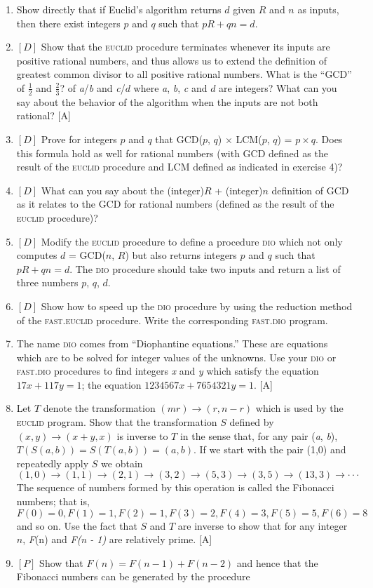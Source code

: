 \documentclass{book}
\begin{document}
\begin{enumerate}
\item Show directly that if Euclid's algorithm returns $d$ given $R$ and $n$ as
inputs, then there exist integers $p$ and $q$ such that $pR + qn = d$.  
\item $[D]$ Show that the \textsc{euclid} procedure terminates whenever its inputs
are positive rational numbers, and thus allows us to extend the definition
of greatest common divisor to all positive rational numbers. What is the
``GCD'' of $\frac{1}{2}$ and $\frac{2}{3}$? of {\em a}/{\em b} and {\em c}/$d$ where {\em a}, {\em b}, {\em c} and $d$ are integers?
What can you say about the behavior of the algorithm when the inputs
are not both rational? [A]
\item $[D]$ Prove for integers $p$ and $q$ that GCD($p$, $q$) $\times$ LCM($p$, $q$) = $p \times q$. 
Does this formula hold as well for rational numbers (with GCD defined
as the result of the \textsc{euclid} procedure and LCM defined as indicated in
exercise 4)?
\item $[D]$ What can you say about the (integer)$R$ + (integer)$n$ definition
of GCD as it relates to the GCD for rational numbers (defined as the
result of the \textsc{euclid} procedure)?
\item $[D]$ Modify the \textsc{euclid} procedure to define a procedure \textsc{dio} which
not only computes $d$ = GCD($n$, $R$) but also returns integers $p$ and $q$
such that $pR + qn = d$. The \textsc{dio} procedure should take two inputs and
return a list of three numbers $p$, $q$, $d$.  
\item $[D]$ Show how to speed up the \textsc{dio} procedure by using the reduction method of the \textsc{fast.euclid} procedure. Write the corresponding
\textsc{fast.dio} program.  
\item The name \textsc{dio} comes from ``Diophantine equations.'' These are
equations which are to be solved for integer values of the unknowns. Use
your \textsc{dio} or \textsc{fast.dio} procedures to find integers {\em x} and {\em y} which satisfy
the equation $17x + 117y = 1$; the equation $1234567x + 7654321y = 1$. [A]
\item Let $T$ denote the transformation $(mr) \rightarrow (r, n - r)$ which is used
by the \textsc{euclid} program. Show that the transformation $S$ defined by
$(x, y) \rightarrow (x + y, x)$ is inverse to $T$ in the sense that, for any pair ({\em a}, {\em b}),
$T(S(a,b)) = S(T(a,b)) = (a, b)$. If we start with the pair (1,0) and
repeatedly apply $S$ we obtain
$$(1,0) \rightarrow (1, 1) \rightarrow (2,1) \rightarrow (3,2) \rightarrow (5,3) \rightarrow (3,5) \rightarrow (13,3) \rightarrow \cdot \cdot \cdot $$
\noindent The sequence of numbers formed by this operation is called the Fibonacci
numbers; that is,
$$F(0)=0,F(1)=1,F(2)=1,F(3)=2,F(4)=3,F(5)=5,F(6)=8$$
\noindent and so on. Use the fact that $S$ and $T$ are inverse to show that for any
integer $n$, {\em F}(n) and {\em F(n - 1)} are relatively prime. [A]
\item $[P]$ Show that $F(n) = F(n - 1) + F(n - 2)$ and hence that the
Fibonacci numbers can be generated by the procedure


\end{enumerate}
\end{document}
